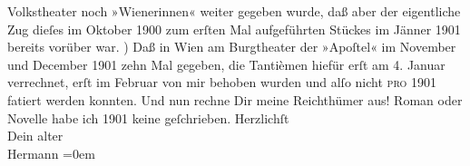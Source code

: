 \begin{ledgroupsized}[t]{13cm}
                  Volkstheater noch »Wienerinnen« weiter
               gegeben wurde, daß aber der eigentliche Zug dieſes im Oktober 1900 zum erſten Mal
               aufgeführten Stückes im Jänner 1901 bereits vorüber war.\pend
           ) Daß in Wien am Burgtheater der »Apoſtel« im November
               und December 1901 zehn Mal gegeben, die {\pb}Tantièmen
               hiefür erſt am 4. Januar verrechnet, erſt im Februar von mir behoben wurden und alſo
               nicht \textsc{pro} 1901 fatiert werden konnten. Und nun rechne Dir
               meine Reichthümer aus! Roman oder Novelle habe ich 1901 keine geſchrieben.\pend
           \pstart
           Herzlichſt{\\[\baselineskip]}Dein alter{\\[\baselineskip]}\spacefill\mbox{Hermann}\pend
           \leftskip=0em{}
         
         \endnumbering{}\end{ledgroupsized}  \newcommand{\dateiname}{L01230}\newcommand{\titel}{Hermann Bahr an Arthur Schnitzler, 10. 7. [1902]}\newcommand{\editorInnen}{ Kurt Ifkovits,  Martin Anton Müller}
      